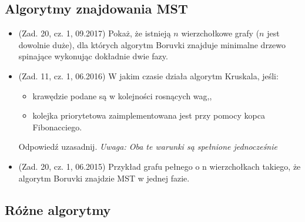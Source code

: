 \documentclass[10pt]{article}%
\begin{document}
\subsection{Algorytmy znajdowania MST}
\begin{itemize}

\item (Zad. 20, cz. 1, 09.2017) Pokaż, że istnieją $n$ wierzchołkowe grafy ($n$ jest dowolnie duże), dla których algorytm Boruvki znajduje minimalne drzewo spinające wykonując dokładnie dwie fazy.

\item (Zad. 11, cz. 1, 06.2016) W jakim czasie działa algorytm Kruskala, jeśli:
\begin{itemize}
	\item krawędzie podane są w kolejności rosnących wag,,
	\item kolejka priorytetowa zaimplementowana jest przy pomocy kopca Fibonacciego.
\end{itemize}
Odpowiedź uzasadnij. \textit{Uwaga: Oba te warunki są spełnione jednocześnie}

\item (Zad. 20, cz. 1, 06.2015) Przykład grafu pełnego o n wierzchołkach takiego, że algorytm Boruvki znajdzie MST w jednej fazie.

\end{itemize}


\subsection{Różne algorytmy}
\end{document}

